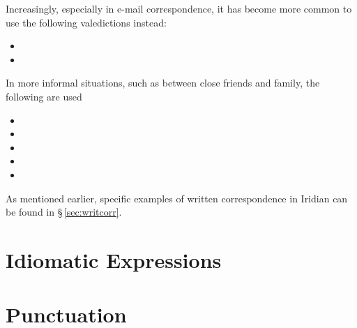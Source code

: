Increasingly, especially in e-mail correspondence, it has become more common to use the following valedictions instead:

\begin{itemize}[nosep]
	\item {}
	\item {}
\end{itemize}

In more informal situations, such as between close friends and family, the following are used

\begin{itemize}[nosep]
	\item {}
	\item {}
	\item {}
	\item {}
	\item {}
\end{itemize}

As mentioned earlier, specific examples of written correspondence in Iridian can be found in \S\,\ref{sec:writcorr}.


\section{Idiomatic Expressions}

\section{Punctuation}